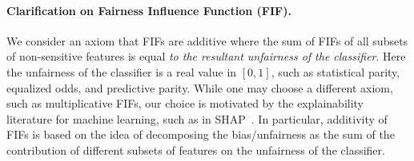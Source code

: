 \paragraph{Clarification on Fairness Influence Function (FIF).} We consider an axiom that FIFs are additive where the sum of FIFs of all subsets of non-sensitive features is equal \textit{to the resultant unfairness of the classifier}. Here the unfairness of the classifier is a real value in $ [0,1] $, such as statistical parity, equalized odds, and predictive parity. While one may choose a different axiom, such as multiplicative FIFs, our choice is motivated by the explainability literature for machine learning, such as in SHAP~\cite{begley2020explainability,lundberg2020explaining}. In particular, additivity of FIFs is based on the idea of decomposing the bias/unfairness as the sum of the contribution of different subsets of features on the unfairness of the classifier.




